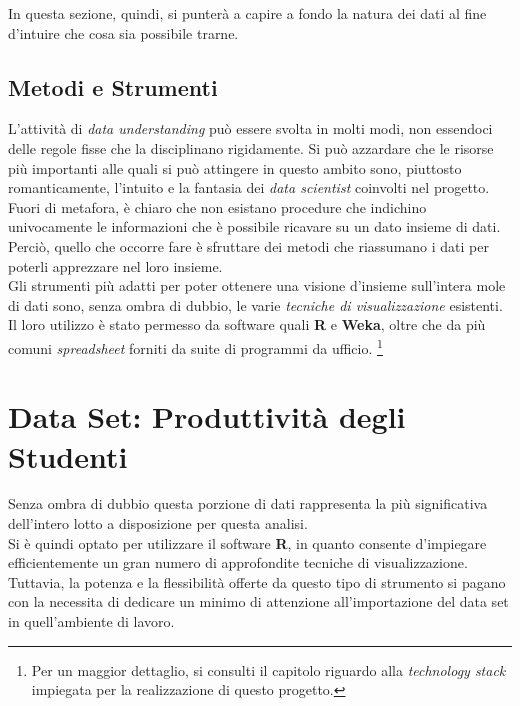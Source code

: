             In questa sezione, quindi, si punterà a capire a fondo la natura dei dati al fine d'intuire che cosa sia possibile trarne.

        \subsection{Metodi e Strumenti}

            L'attività di \textit{data understanding} può essere svolta in molti modi, non essendoci delle regole fisse che la disciplinano rigidamente. Si può azzardare che le risorse più importanti alle quali si può attingere in questo ambito sono, piuttosto romanticamente, l'intuito e la fantasia dei \textit{data scientist} coinvolti nel progetto. Fuori di metafora, è chiaro che non esistano procedure che indichino univocamente le informazioni che è possibile ricavare su un dato insieme di dati. Perciò, quello che occorre fare è sfruttare dei metodi che riassumano i dati per poterli apprezzare nel loro insieme. \\

            Gli strumenti più adatti per poter ottenere una visione d'insieme sull'intera mole di dati sono, senza ombra di dubbio, le varie \textit{tecniche di visualizzazione} esistenti. Il loro utilizzo è stato permesso da software quali \textbf{R} e \textbf{Weka}, oltre che da più comuni \textit{spreadsheet} forniti da suite di programmi da ufficio. \footnote{Per un maggior dettaglio, si consulti il capitolo riguardo alla \textit{technology stack} impiegata per la realizzazione di questo progetto.}

    \section{Data Set: Produttività degli Studenti}

        Senza ombra di dubbio questa porzione di dati rappresenta la più significativa dell'intero lotto a disposizione per questa analisi. \\

        Si è quindi optato per utilizzare il software \textbf{R}, in quanto consente d'impiegare efficientemente un gran numero di approfondite tecniche di visualizzazione. Tuttavia, la potenza e la flessibilità offerte da questo tipo di strumento si pagano con la necessita di dedicare un minimo di attenzione all'importazione del data set in quell'ambiente di lavoro. \\

